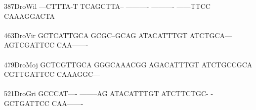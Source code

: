 \documentclass[11pt,twoside,reqno,a4paper]{article}
\begin{document}
{387\hspace*{1\charwidth}DroWil	---CTTTA-T	TCAGCTTA--	----------	----------	------TTCC	CAAAGGACTA	\\
\hspace*{4\charwidth}\hspace*{7\charwidth}\hspace*{1\charwidth}\hspace*{1\charwidth}\hspace*{1\charwidth}\hspace*{1\charwidth}\hspace*{1\charwidth}\hspace*{1\charwidth}\\
463\hspace*{1\charwidth}DroVir	GCTCATTGCA	GCGC--GCAG	ATACATTTGT	ATCTGCA---	AGTCGATTCC	CAA-------	\\
\hspace*{4\charwidth}\hspace*{7\charwidth}\hspace*{1\charwidth}\hspace*{1\charwidth}\hspace*{1\charwidth}\hspace*{1\charwidth}\hspace*{1\charwidth}\hspace*{1\charwidth}\\
479\hspace*{1\charwidth}DroMoj	GCTCGTTGCA	GGGCAAACGG	AGACATTTGT	ATCTGCCGCA	CGTTGATTCC	CAAAGGC---	\\
\hspace*{4\charwidth}\hspace*{7\charwidth}\hspace*{1\charwidth}\hspace*{1\charwidth}\hspace*{1\charwidth}\hspace*{1\charwidth}\hspace*{1\charwidth}\hspace*{1\charwidth}\\
521\hspace*{1\charwidth}DroGri	GCCCAT----	--------AG	ATACATTTGT	ATCTTCTGC-	-GCTGATTCC	CAA-------	\\
\hspace*{4\charwidth}\hspace*{7\charwidth}\hspace*{1\charwidth}\hspace*{1\charwidth}\hspace*{1\charwidth}\hspace*{1\charwidth}\hspace*{1\charwidth}\hspace*{1\charwidth}\\
}
\end{document}

